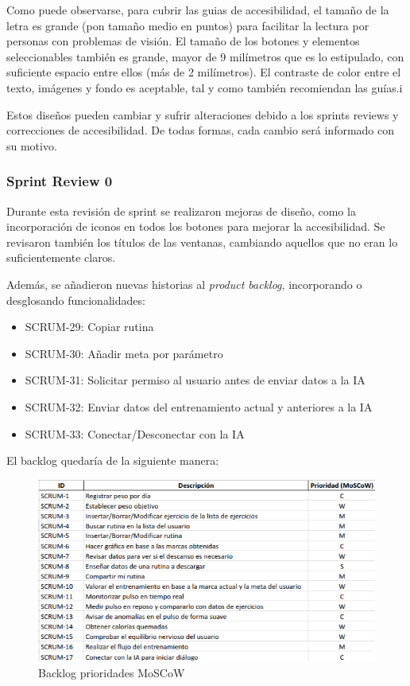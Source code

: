 Como puede observarse, para cubrir las guias de accesibilidad, el tamaño de la letra es grande (pon tamaño medio en puntos) para facilitar la lectura por personas con problemas de visión. El tamaño de los botones y elementos seleccionables también es grande, mayor de 9 milímetros que es lo estipulado, con suficiente espacio entre ellos (más de 2 milímetros). El contraste de color entre el texto, imágenes y fondo es aceptable, tal y como también recomiendan las guías.i

Estos diseños pueden cambiar y sufrir alteraciones debido a los sprints reviews y correcciones de accesibilidad. De todas formas, cada cambio será informado con su motivo.

\subsubsection{Sprint Review 0}
Durante esta revisión de sprint se realizaron mejoras de diseño, como la incorporación de iconos en todos los botones para mejorar la accesibilidad. Se revisaron también los títulos de las ventanas, cambiando aquellos que no eran lo suficientemente claros.

Además, se añadieron nuevas historias al \textit{product backlog}, incorporando o desglosando funcionalidades:

\begin{itemize}
  \item SCRUM-29: Copiar rutina
  \item SCRUM-30: Añadir meta por parámetro
  \item SCRUM-31: Solicitar permiso al usuario antes de enviar datos a la IA
  \item SCRUM-32: Enviar datos del entrenamiento actual y anteriores a la IA
  \item SCRUM-33: Conectar/Desconectar con la IA
\end{itemize}

El backlog quedaría de la siguiente manera:

\begin{landscape}
\begin{figure}[H]
   \centering
    \includegraphics[width=1.5\textwidth]{tablas/backlog1.png}
    \caption{Backlog prioridades MoSCoW}
    \label{fig:backlog1}
\end{figure}
\end{landscape}

